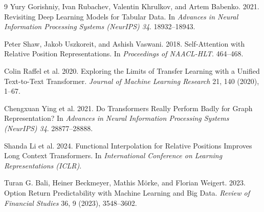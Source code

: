 \documentclass[sigconf,review,anonymous]{acmart}
\begin{document}
\begin{thebibliography}{9}
Yury Gorishniy, Ivan Rubachev, Valentin Khrulkov, and Artem Babenko. 2021. Revisiting Deep Learning Models for Tabular Data. In \textit{Advances in Neural Information Processing Systems (NeurIPS) 34}. 18932--18943.

Peter Shaw, Jakob Uszkoreit, and Ashish Vaswani. 2018. Self-Attention with Relative Position Representations. In \textit{Proceedings of NAACL-HLT}. 464--468.

Colin Raffel et al. 2020. Exploring the Limits of Transfer Learning with a Unified Text-to-Text Transformer. \textit{Journal of Machine Learning Research} 21, 140 (2020), 1--67.

Chengxuan Ying et al. 2021. Do Transformers Really Perform Badly for Graph Representation? In \textit{Advances in Neural Information Processing Systems (NeurIPS) 34}. 28877--28888.

Shanda Li et al. 2024. Functional Interpolation for Relative Positions Improves Long Context Transformers. In \textit{International Conference on Learning Representations (ICLR)}.

Turan G. Bali, Heiner Beckmeyer, Mathis M\"orke, and Florian Weigert. 2023. Option Return Predictability with Machine Learning and Big Data. \textit{Review of Financial Studies} 36, 9 (2023), 3548--3602.

\end{thebibliography}
\endgroup
\end{document}
